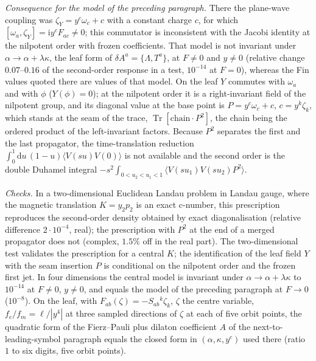 \emph{Consequence for the model of the preceding paragraph.} There the plane-wave coupling was \(\zeta_Y=y^c\omega_c+c\) with a constant charge \(c\), for which \([\omega_a,\zeta_Y]=\mathrm iy^cF_{ac}\ne0\); this commutator is inconsistent with the Jacobi identity at the nilpotent order with frozen coefficients. That model is not invariant under \(\alpha\to\alpha+\lambda\kappa\), the leaf form of \(\delta A^a=\{\Lambda,T^a\}\), at \(F\ne0\) and \(y\ne0\) (relative change \(0.07\)--\(0.16\) of the second-order response in a test, \(10^{-14}\) at \(F=0\)), whereas the Fin values quoted there are values of that model. On the leaf \(Y\) commutes with \(\omega_a\) and with \(\phi\) (\(Y(\phi)=0\)); at the nilpotent order it is a right-invariant field of the nilpotent group, and its diagonal value at the base point is \(P=y^c\omega_c+c\), \(c=y^k\zeta_k\), which stands at the seam of the trace, \(\operatorname{Tr}[\text{chain}\cdot P^2]\), the chain being the ordered product of the left-invariant factors. Because \(P^2\) separates the first and the last propagator, the time-translation reduction \(\int_0^1\mathrm du\,(1-u)\langle V(su)V(0)\rangle\) is not available and the second order is the double Duhamel integral \(-s^2\int_{0<u_2<u_1<1}\langle V(su_1)V(su_2)P^2\rangle\).



\emph{Checks.} In a two-dimensional Euclidean Landau problem in Landau gauge, where the magnetic translation \(K=y_2p_2\) is an exact c-number, this prescription reproduces the second-order density obtained by exact diagonalisation (relative difference \(2\cdot10^{-4}\), real); the prescription with \(P^2\) at the end of a merged propagator does not (complex, \(1.5\%\) off in the real part). The two-dimensional test validates the prescription for a central \(K\); the identification of the leaf field \(Y\) with the seam insertion \(P\) is conditional on the nilpotent order and the frozen first jet. In four dimensions the central model is invariant under \(\alpha\to\alpha+\lambda\kappa\) to \(10^{-14}\) at \(F\ne0\), \(y\ne0\), and equals the model of the preceding paragraph at \(F\to0\) (\(10^{-8}\)). On the leaf, with \(F_{ab}(\zeta)=-S_{ab}{}^k\zeta_k\), \(\zeta\) the centre variable, \(f_e/f_m=\ell/|y^4|\) at three sampled directions of \(\zeta\) at each of five orbit points, the quadratic form of the Fierz--Pauli plus dilaton coefficient \(A\) of the next-to-leading-symbol paragraph equals the closed form in \((\alpha,\kappa,y^c)\) used there (ratio \(1\) to six digits, five orbit points).



